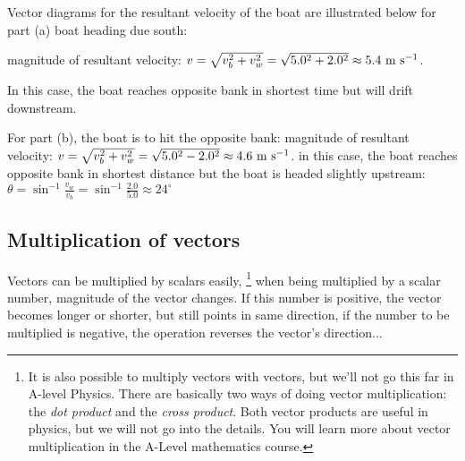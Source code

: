 \begin{soln} Vector diagrams for the resultant velocity of the boat are illustrated below for part (a) boat heading due south:

magnitude of resultant velocity: $v = \sqrt{v_b^2 + v_w^2} = \sqrt{5.0^2 +2.0^2} \approx 5.4 \text{ m s$^{-1}$}$.

In this case, the boat reaches opposite bank in shortest time but will drift downstream.
\end{soln}
\begin{figure}
		\centering
		
\end{figure}		
\begin{soln}
For part (b), the boat is to hit the opposite bank:
magnitude of resultant velocity: $v = \sqrt{v_b^2 + v_w^2} = \sqrt{5.0^2 -2.0^2} \approx 4.6 \text{ m s$^{-1}$}$. in this case, the boat reaches opposite bank in shortest distance but the boat is headed slightly upstream: $\theta = \sin^{-1} \frac{v_w}{v_b} = \sin^{-1}\frac{2.0}{5.0} \approx 24^\circ$
\end{soln}		
  
\begin{figure}	
		\centering
\end{figure}


\subsection{Multiplication of vectors}

Vectors can be multiplied by scalars easily, 
\footnote{It is also possible to multiply vectors with vectors, but we'll not go this far in A-level Physics. There are basically two ways of doing vector multiplication: the \emph{dot product} and the \emph{cross product}. Both vector products are useful in physics, but we will not go into the details. You will learn more about vector multiplication in the A-Level mathematics course.\piste} when being multiplied by a scalar number, magnitude of the vector changes. If this number is positive, the vector becomes longer or shorter, but still points in same direction, if the number to be multiplied is negative, the operation reverses the vector's direction...

